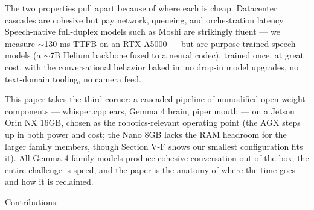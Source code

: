 \documentclass[journal]{IEEEtran}
\begin{document}
The two properties pull apart because of where each is cheap. Datacenter cascades are cohesive but pay network, queueing, and orchestration latency. Speech-native full-duplex models such as Moshi \cite{defossez2024moshi} are strikingly fluent — we measure $\sim$130 ms TTFB on an RTX A5000 — but are purpose-trained speech models (a $\sim$7B Helium backbone fused to a neural codec), trained once, at great cost, with the conversational behavior baked in: no drop-in model upgrades, no text-domain tooling, no camera feed.

This paper takes the third corner: a cascaded pipeline of unmodified open-weight components — whisper.cpp ears, Gemma 4 brain, piper mouth — on a Jetson Orin NX 16GB, chosen as the robotics-relevant operating point (the AGX steps up in both power and cost; the Nano 8GB lacks the RAM headroom for the larger family members, though Section V-F shows our smallest configuration fits it). All Gemma 4 family models produce cohesive conversation out of the box; the entire challenge is speed, and the paper is the anatomy of where the time goes and how it is reclaimed.

Contributions:
\end{document}
